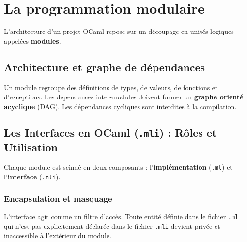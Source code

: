 \documentclass{article}
\begin{document}
\section{La programmation modulaire}

L'architecture d'un projet OCaml repose sur un découpage en unités logiques appelées \textbf{modules}.

\subsection{Architecture et graphe de dépendances}

Un module regroupe des définitions de types, de valeurs, de fonctions et d'exceptions. Les dépendances inter-modules doivent former un \textbf{graphe orienté acyclique} (DAG). Les dépendances cycliques sont interdites à la compilation.


\begin{center}
\end{center}

\subsection{Les Interfaces en OCaml (\texttt{.mli}) : Rôles et Utilisation}

Chaque module est scindé en deux composants : l'\textbf{implémentation} (\texttt{.ml}) et l'\textbf{interface} (\texttt{.mli}).

\subsubsection{Encapsulation et masquage}
L'interface agit comme un filtre d'accès. Toute entité définie dans le fichier \texttt{.ml} qui n'est pas explicitement déclarée dans le fichier \texttt{.mli} devient privée et inaccessible à l'extérieur du module.
\end{document}
